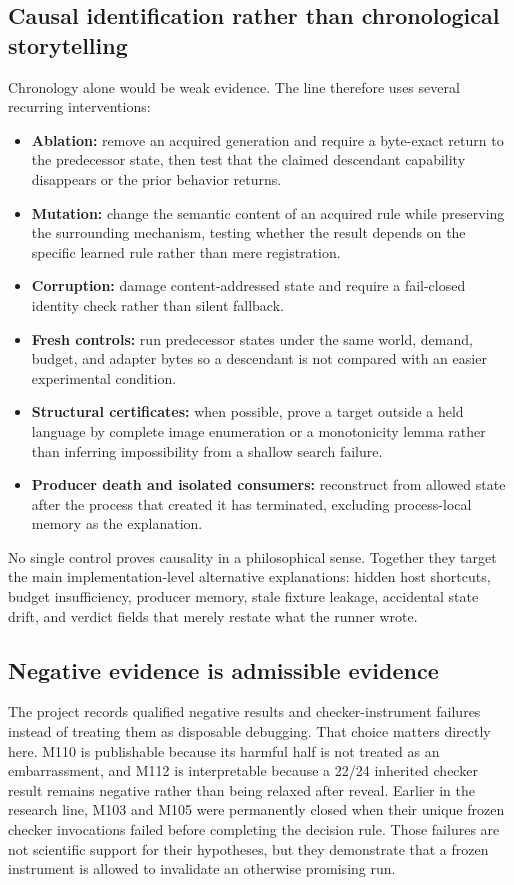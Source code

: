 \subsection{Causal identification rather than chronological storytelling}
Chronology alone would be weak evidence. The line therefore uses several recurring interventions:
\begin{itemize}
  \item \textbf{Ablation:} remove an acquired generation and require a byte-exact return to the predecessor state, then test that the claimed descendant capability disappears or the prior behavior returns.
  \item \textbf{Mutation:} change the semantic content of an acquired rule while preserving the surrounding mechanism, testing whether the result depends on the specific learned rule rather than mere registration.
  \item \textbf{Corruption:} damage content-addressed state and require a fail-closed identity check rather than silent fallback.
  \item \textbf{Fresh controls:} run predecessor states under the same world, demand, budget, and adapter bytes so a descendant is not compared with an easier experimental condition.
  \item \textbf{Structural certificates:} when possible, prove a target outside a held language by complete image enumeration or a monotonicity lemma rather than inferring impossibility from a shallow search failure.
  \item \textbf{Producer death and isolated consumers:} reconstruct from allowed state after the process that created it has terminated, excluding process-local memory as the explanation.
\end{itemize}
No single control proves causality in a philosophical sense. Together they target the main implementation-level alternative explanations: hidden host shortcuts, budget insufficiency, producer memory, stale fixture leakage, accidental state drift, and verdict fields that merely restate what the runner wrote.

\subsection{Negative evidence is admissible evidence}
The project records qualified negative results and checker-instrument failures instead of treating them as disposable debugging. That choice matters directly here. M110 is publishable because its harmful half is not treated as an embarrassment, and M112 is interpretable because a 22/24 inherited checker result remains negative rather than being relaxed after reveal. Earlier in the research line, M103 and M105 were permanently closed when their unique frozen checker invocations failed before completing the decision rule. Those failures are not scientific support for their hypotheses, but they demonstrate that a frozen instrument is allowed to invalidate an otherwise promising run.

